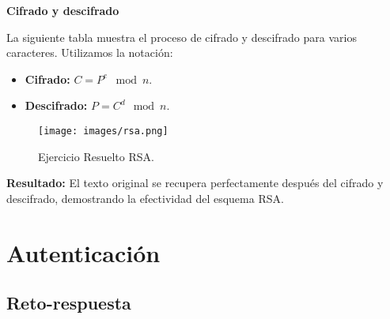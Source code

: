 \documentclass[a4paper,12pt]{article}
\begin{document}
\textbf{Cifrado y descifrado}

La siguiente tabla muestra el proceso de cifrado y descifrado para varios caracteres. Utilizamos la notación:

\begin{itemize}
    \item \textbf{Cifrado:} \(C = P^e \mod n\).
    \item \textbf{Descifrado:} \(P = C^d \mod n\).
\end{itemize}

\begin{figure}[H]
    \centering
    \texttt{[image: images/rsa.png]}
    \caption{Ejercicio Resuelto RSA.}
\end{figure}

\textbf{Resultado:} El texto original se recupera perfectamente después del cifrado y descifrado, demostrando la efectividad del esquema RSA.

\section{Autenticación}
\subsection{Reto-respuesta}
\end{document}

